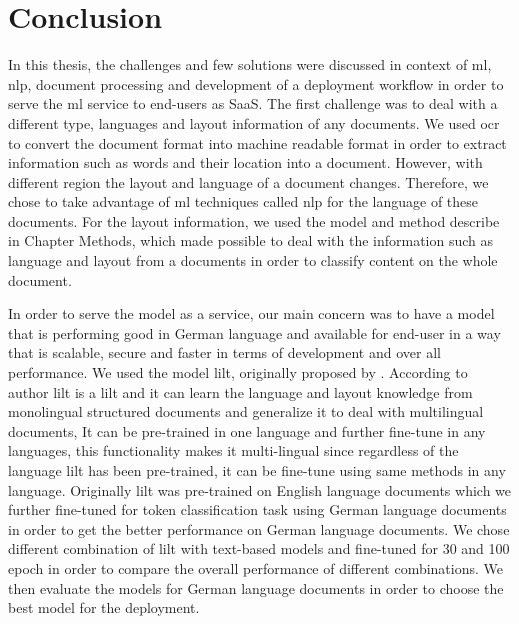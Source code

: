 \chapter{Conclusion}

In this thesis, the challenges and few solutions were discussed in context of \acrshort{ml}, \acrshort{nlp}, document processing and development of a deployment workflow in order to serve the \acrshort{ml} service to end-users as SaaS. The first challenge was to deal with a different type, languages and layout information of any documents. We used \acrshort{ocr} to convert the document format into machine readable format in order to extract information such as words and their location into a document. However, with different region the layout and language of a document changes. Therefore, we chose to take advantage of \acrshort{ml} techniques called \acrlong{nlp} for the language of these documents. For the layout information, we used the model and method describe in Chapter Methods, which made possible to deal with the information such as language and layout from a documents in order to classify content on the whole document. 

In order to serve the model as a service, our main concern was to have a model that is performing good in German language and available for end-user in a way that is scalable, secure and faster in terms of development and over all performance. We used the model \acrshort{lilt}, originally proposed by \cite{wang-etal-2022-lilt}. According to author \cite{wang-etal-2022-lilt} \acrshort{lilt} is a \acrlong{lilt} and it can learn the language and layout knowledge from monolingual structured documents and generalize it to deal with multilingual documents, It can be pre-trained in one language and further fine-tune in any languages, this functionality makes it multi-lingual since regardless of the language \acrshort{lilt} has been pre-trained, it can be fine-tune using same methods in any language. Originally \acrshort{lilt} was pre-trained on English language documents which we further fine-tuned for token classification task using German language documents in order to get the better performance on German language documents. We chose different combination of \acrshort{lilt} with text-based models and fine-tuned for 30 and 100 epoch in order to compare the overall performance of different combinations. We then evaluate the models for German language documents in order to choose the best model for the deployment. 

